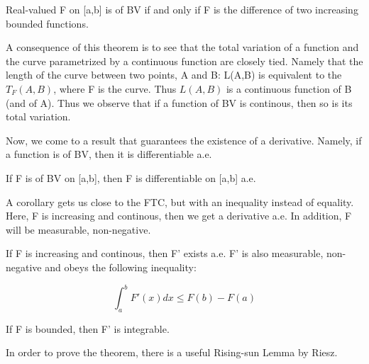 \documentclass[class=article, crop=false]{standalone}
\begin{document}
			\begin{theorem} 

				Real-valued F on [a,b] is of BV if and only if F is the difference of two increasing bounded functions.
			\end{theorem}

			A consequence of this theorem is to see that the total variation of a function and the curve parametrized by a continuous function are closely tied. Namely that the length of the curve between two points, A and B: L(A,B) is equivalent to the $T_F(A,B)$, where F is the curve. Thus $L(A,B)$ is a continuous function of B (and of A). Thus we observe that if a function of BV is continous, then so is its total variation.

			Now, we come to a result that guarantees the existence of a derivative. Namely, if a function is of BV, then it is differentiable a.e.

			\begin{theorem} 
			\label{thm:bv_funcs_derivatives_exist}
				If F is of BV on [a,b], then F is differentiable on [a,b] a.e.
			\end{theorem}

			A corollary gets us close to the FTC, but with an inequality instead of equality. Here, F is increasing and continous, then we get a derivative a.e. In addition, F will be measurable, non-negative.

			\begin{corollary}
				If F is increasing and continous, then F' exists a.e. F' is also measurable, non-negative and obeys the following inequality:

					$$\int_a^b F'(x) dx \le F(b) - F(a)$$

				If F is bounded, then F' is integrable.
			\end{corollary}

			In order to prove the theorem, there is a useful Rising-sun Lemma by Riesz.
\end{document}
